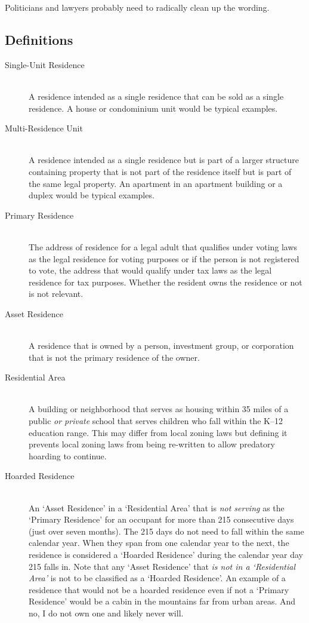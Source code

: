 Politicians and lawyers probably need to radically clean up the wording.

\subsection{Definitions}

\begin{description}
  \item[Single-Unit Residence] \hfill \\ A residence intended as a single residence that can be sold as a single residence. A house or condominium unit would be typical examples.
  \item[Multi-Residence Unit] \hfill \\ A residence intended as a single residence but is part of a larger structure containing property that is not part of the residence itself but is part of the same legal property. An apartment in an apartment building or a duplex would be typical examples.
  \item[Primary Residence] \hfill \\ The address of residence for a legal adult that qualifies under voting laws as the legal residence for voting purposes or if the person is not registered to vote, the address that would qualify under tax laws as the legal residence for tax purposes. Whether the resident owns the residence or not is not relevant.
  \item[Asset Residence] \hfill \\ A residence that is owned by a person, investment group, or corporation that is not the primary residence of the owner.
  \item[Residential Area] \hfill \\ A building or neighborhood that serves as housing within 35 miles of a public \emph{or private} school that serves children who fall within the K--12 education range. This may differ from local zoning laws but defining it prevents local zoning laws from being re-written to allow predatory hoarding to continue.
  \item[Hoarded Residence] \hfill \\ An `Asset Residence' in a `Residential Area' that is \emph{not serving} as the `Primary Residence' for an occupant for more than 215 consecutive days (just over seven months). The 215 days do not need to fall within the same calendar year. When they span from one calendar year to the next, the residence is considered a `Hoarded Residence' during the calendar year day 215 falls in. Note that any `Asset Residence' that \emph{is not in a `Residential Area'} is not to be classified as a `Hoarded Residence'. An example of a residence that would not be a hoarded residence even if not a `Primary Residence' would be a cabin in the mountains far from urban areas. And no, I do not own one and likely never will.
\end{description}

